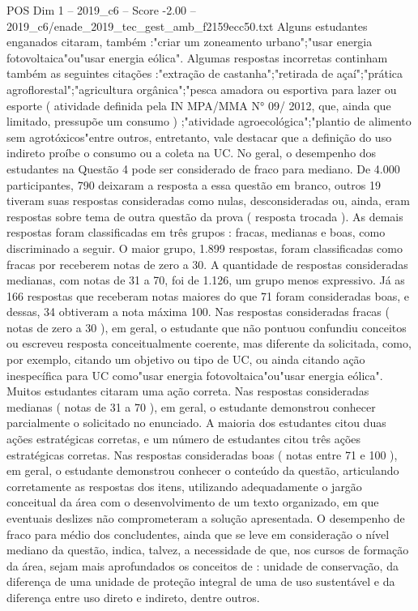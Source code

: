 \begin{textsample}{POS Dim 1 – 2019\_c6 – Score -2.00 – 2019\_c6/enade\_2019\_tec\_gest\_amb\_f2159ecc50.txt}
Alguns estudantes enganados citaram, também :"criar um zoneamento urbano";"usar energia fotovoltaica"ou"usar energia eólica".
Algumas respostas incorretas continham também as seguintes citações :"extração de castanha";"retirada de açaí";"prática agroflorestal";"agricultura orgânica";"pesca amadora ou esportiva para lazer ou esporte ( atividade definida pela IN MPA/MMA N{\EmojiFont °} 09/ 2012, que, ainda que limitado, pressupõe um consumo ) ;"atividade agroecológica";"plantio de alimento sem agrotóxicos"entre outros, entretanto, vale destacar que a definição do uso indireto proíbe o consumo ou a coleta na UC.
No geral, o desempenho dos estudantes na Questão 4 pode ser considerado de fraco para mediano.
De 4.000 participantes, 790 deixaram a resposta a essa questão em branco, outros 19 tiveram suas respostas consideradas como nulas, desconsideradas ou, ainda, eram respostas sobre tema de outra questão da prova ( resposta trocada ).
As demais respostas foram classificadas em três grupos : fracas, medianas e boas, como discriminado a seguir.
O maior grupo, 1.899 respostas, foram classificadas como fracas por receberem notas de zero a 30.
A quantidade de respostas consideradas medianas, com notas de 31 a 70, foi de 1.126, um grupo menos expressivo.
Já as 166 respostas que receberam notas maiores do que 71 foram consideradas boas, e dessas, 34 obtiveram a nota máxima 100.
Nas respostas consideradas fracas ( notas de zero a 30 ), em geral, o estudante que não pontuou confundiu conceitos ou escreveu resposta conceitualmente coerente, mas diferente da solicitada, como, por exemplo, citando um objetivo ou tipo de UC, ou ainda citando ação inespecífica para UC como"usar energia fotovoltaica"ou"usar energia eólica".
Muitos estudantes citaram uma ação correta.
Nas respostas consideradas medianas ( notas de 31 a 70 ), em geral, o estudante demonstrou conhecer parcialmente o solicitado no enunciado.
A maioria dos estudantes citou duas ações estratégicas corretas, e um número de estudantes citou três ações estratégicas corretas.
Nas respostas consideradas boas ( notas entre 71 e 100 ), em geral, o estudante demonstrou conhecer o conteúdo da questão, articulando corretamente as respostas dos itens, utilizando adequadamente o jargão conceitual da área com o desenvolvimento de um texto organizado, em que eventuais deslizes não comprometeram a solução apresentada.
O desempenho de fraco para médio dos concludentes, ainda que se leve em consideração o nível mediano da questão, indica, talvez, a necessidade de que, nos cursos de formação da área, sejam mais aprofundados os conceitos de : unidade de conservação, da diferença de uma unidade de proteção integral de uma de uso sustentável e da diferença entre uso direto e indireto, dentre outros.

\end{textsample}
